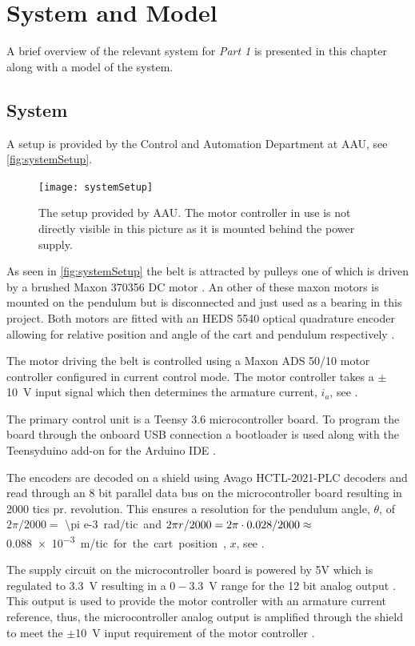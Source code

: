 \chapter{System and Model}\label{chap:model}
A brief overview of the relevant system for \textit{Part 1} is presented in this chapter along with a model of the system.

\section{System}\label{sec:system}
A setup is provided by the Control and Automation Department at AAU, see \autoref{fig:systemSetup}.

\begin{figure}[H]
  \texttt{[image: systemSetup]}
  \caption{The setup provided by AAU. The motor controller in use is not directly visible in this picture as it is mounted behind the power supply.}
  \label{fig:systemSetup}
\end{figure}

As seen in \autoref{fig:systemSetup} the belt is attracted by pulleys one of which is driven by a brushed Maxon 370356 DC motor \cite{maxonMotor}. An other of these maxon motors is mounted on the pendulum but is disconnected and just used as a bearing in this project. Both motors are fitted with an HEDS 5540 optical quadrature encoder allowing for relative position and angle of the cart and pendulum respectively \cite{avagoTechnologies}.

The motor driving the belt is controlled using a Maxon ADS 50/10 motor controller configured in current control mode. The motor controller takes a $\pm$\SI{10}{V} input signal which then determines the armature current, $i_a$, see \cite{maxonMotorController}.

The primary control unit is a Teensy 3.6 microcontroller board. To program the board through the onboard USB connection a bootloader is used along with the Teensyduino add-on for the Arduino IDE \cite{sprkfunTeensy}.

The encoders are decoded on a shield using Avago HCTL-2021-PLC decoders and read through an 8 bit parallel data bus on the microcontroller board resulting in 2000 tics pr. revolution. This ensures a resolution for the pendulum angle, $\theta$, of $2\pi/2000=$ \SI{\pi e-3} rad/tic and $2\pi r /2000=\nolinebreak 2\pi\cdot 0.028 /2000\approx$ \SI{0.088e-3} m/tic for the cart position, $x$, see \cite{avagoDataSheet}.

The supply circuit on the microcontroller board is powered by 5V which is regulated to \SI{3.3}{V} resulting in a $0-$\SI{3.3}{V} range for the 12 bit analog output \cite{teensyDataSheet}. This output is used to provide the motor controller with an armature current reference, thus, the microcontroller analog output is amplified through the shield to meet the $\pm$\SI{10}{V} input requirement of the motor controller \cite{JHHorgensen}.

